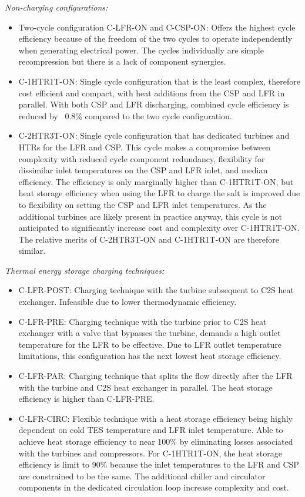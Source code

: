 \begin{paracol}{2}
\textit{Non-charging configurations:}
\begin{itemize}
    \item	Two-cycle configuration C-LFR-ON and C-CSP-ON: Offers the highest cycle efficiency because of the freedom of the two cycles to operate independently when generating electrical power. The cycles individually are simple recompression but there is a lack of component synergies.
    \item	C-1HTR1T-ON: Single cycle configuration that is the least complex, therefore cost efficient and compact, with heat additions from the CSP and LFR in parallel. With both CSP and LFR discharging, combined cycle efficiency is reduced by ~0.8\% compared to the two cycle configuration. 
    \item   C-2HTR3T-ON: Single cycle configuration that has dedicated turbines and HTRs for the LFR and CSP. This cycle makes a compromise between complexity with reduced cycle component redundancy, flexibility for dissimilar inlet temperatures on the CSP and LFR inlet, and median efficiency. The efficiency is only marginally higher than C-1HTR1T-ON, but heat storage efficiency when using the LFR to charge the salt is improved due to flexibility on setting the CSP and LFR inlet temperatures. As the additional turbines are likely present in practice anyway, this cycle is not anticipated to significantly increase cost and complexity over C-1HTR1T-ON. The relative merits of C-2HTR3T-ON and C-1HTR1T-ON are therefore similar.
\end{itemize}

\textit{Thermal energy storage charging techniques:}
\begin{itemize}
    \item    C-LFR-POST: Charging technique with the turbine subsequent to C2S heat exchanger. Infeasible due to lower thermodynamic efficiency. 
    \item	C-LFR-PRE: Charging technique with the turbine prior to C2S heat exchanger with a valve that bypasses the turbine, demands a high outlet temperature for the LFR to be effective. Due to LFR outlet temperature limitations, this configuration has the next lowest heat storage efficiency.
    \item	C-LFR-PAR: Charging technique that splits the flow directly after the LFR with the turbine and C2S heat exchanger in parallel. The heat storage efficiency is higher than C-LFR-PRE.
    \item   C-LFR-CIRC: Flexible technique with a heat storage efficiency being highly dependent on cold TES temperature and LFR inlet temperature. Able to achieve heat storage efficiency to near 100\% by eliminating losses associated with the turbines and compressors. For C-1HTR1T-ON, the heat storage efficiency is limit to 90\% because the inlet temperatures to the LFR and CSP are constrained to be the same. The additional chiller and circulator components in the dedicated circulation loop increase complexity and cost. 
\end{itemize}


\end{paracol}
